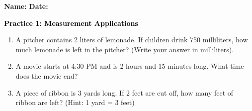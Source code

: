 \documentclass[12pt, letterpaper, fleqn]{article}
\begin{document}
\textbf{Name:} \underline{\hspace{5cm}}
\hfill
\textbf{Date:} \underline{\hspace{3cm}}\\

\begin{tcolorbox}[colback=customteal!20]
    \large\textcolor{black}{\textbf{Practice 1: Measurement Applications}}
\end{tcolorbox}
\begin{enumerate}[itemsep=3.5cm, leftmargin=0.6cm]
\item A pitcher contains 2 liters of lemonade. If children drink 750 milliliters, how much lemonade is left in the pitcher? (Write your answer in milliliters).
\vspace{3.5cm}
\item A movie starts at 4:30 PM and is 2 hours and 15 minutes long. What time does the movie end?
\vspace{3.5cm}
\item A piece of ribbon is 3 yards long. If 2 feet are cut off, how many feet of ribbon are left? (Hint: 1 yard = 3 feet)
\end{enumerate}
\end{document}
